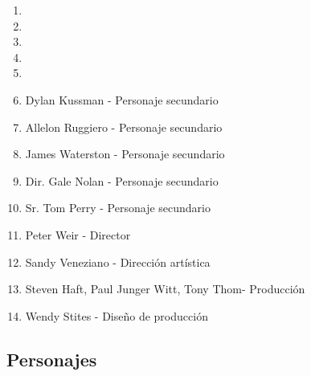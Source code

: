 \documentclass[a5 paper,11 pt]{article}
\begin{document}
{\begin{enumerate}
\item {}
\item {}
\item {}
\item {}
\item {}
\item Dylan Kussman - Personaje secundario 
\item Allelon Ruggiero - Personaje secundario
\item James Waterston - Personaje secundario
\item Dir. Gale Nolan - Personaje secundario
\item Sr. Tom Perry - Personaje secundario
\item Peter Weir - Director
\item Sandy Veneziano - Dirección artística
\item Steven Haft, Paul Junger Witt, Tony Thom- Producción
\item Wendy Stites - Diseño de producción 

\end{enumerate}

\subsection{Personajes}
\begin{itemize}


\end{itemize}}
\end{document}
